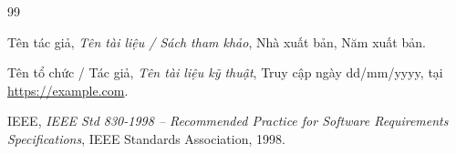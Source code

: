\documentclass[12pt, a4paper]{report}
\begin{document}

\clearpage

\setcounter{page}{1}


\clearpage


\clearpage


\clearpage


\clearpage


\clearpage


\clearpage

\begin{thebibliography}{99}
  \raggedright

  Tên tác giả,
  \textit{Tên tài liệu / Sách tham khảo},
  Nhà xuất bản, Năm xuất bản.

  Tên tổ chức / Tác giả,
  \textit{Tên tài liệu kỹ thuật},
  Truy cập ngày dd/mm/yyyy, tại \url{https://example.com}.

  IEEE, \textit{IEEE Std 830-1998 -- Recommended Practice for Software Requirements Specifications}, IEEE Standards Association, 1998.

\end{thebibliography}
\end{document}
